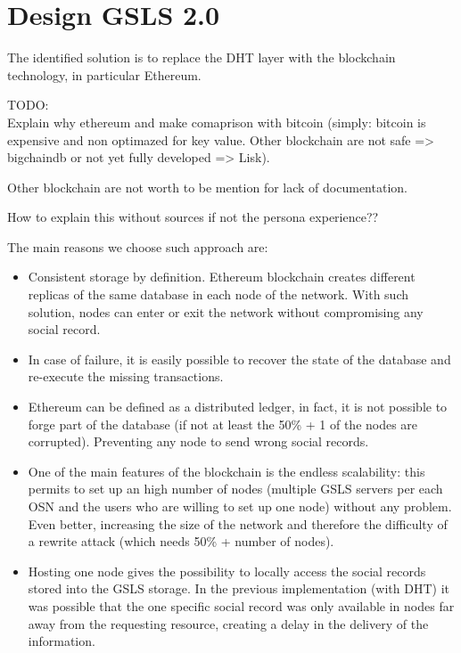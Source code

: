 
\section{Design GSLS 2.0}

The identified solution is to replace the DHT layer with the blockchain technology, in particular Ethereum.

\begin{notation}
  TODO: \\
  Explain why ethereum and make comaprison with bitcoin (simply: bitcoin is expensive and non optimazed for key value. Other blockchain are not safe => bigchaindb or not yet fully developed => Lisk).

  Other blockchain are not worth to be mention for lack of documentation.

  How to explain this without sources if not the persona experience??
\end{notation}
The main reasons we choose such approach are:

\begin{itemize}
  \item Consistent storage by definition. Ethereum blockchain creates different replicas of the same database in each node of the network. With such solution, nodes can enter or exit the network without compromising any social record.
  \item In case of failure, it is easily possible to recover the state of the database and re-execute the missing transactions.
  \item Ethereum can be defined as a distributed ledger, in fact, it is not possible to forge part of the database (if not at least the 50\% + 1 of the nodes are corrupted). Preventing any node to send wrong social records.
  \item One of the main features of the blockchain is the endless scalability: this permits to set up an high number of nodes (multiple GSLS servers per each OSN and the users who are willing to set up one node) without any problem.
  Even better, increasing the size of the network and therefore the difficulty of a rewrite attack (which needs 50\% + number of nodes).
  \item Hosting one node gives the possibility to locally access the social records stored into the GSLS storage. In the previous implementation (with DHT) it was possible that the one specific social record was only available in nodes far away from the requesting resource, creating a delay in the delivery of the information. 
\end{itemize}

